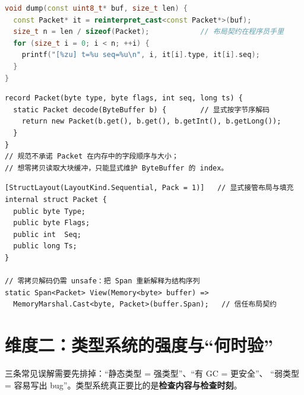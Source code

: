 \documentclass[12pt,a4paper,fontset=fandol]{ctexbook}
\begin{document}
\begin{lstlisting}[language=C++,caption={同一条协议线：把字节流``看成''结构（C 的传统优势）}]
void dump(const uint8_t* buf, size_t len) {
  const Packet* it = reinterpret_cast<const Packet*>(buf);
  size_t n = len / sizeof(Packet);            // 布局契约在程序员手里
  for (size_t i = 0; i < n; ++i) {
    printf("[%zu] t=%u seq=%u\n", i, it[i].type, it[i].seq);
  }
}
\end{lstlisting}

\begin{lstlisting}[style=javastyle,caption={Java 的等价物：没有布局假设，只有逐字段解码}]
record Packet(byte type, byte flags, int seq, long ts) {
  static Packet decode(ByteBuffer b) {        // 显式按字节序解码
    return new Packet(b.get(), b.get(), b.getInt(), b.getLong());
  }
}
// 规范不承诺 Packet 在内存中的字段顺序与大小；
// 想零拷贝读取大块缓冲，只能显式维护 ByteBuffer 的 index。
\end{lstlisting}

\begin{lstlisting}[style=csharpstyle,caption={C\#：默认布局交给运行时，想要 C 式布局必须显式``申请''}]
[StructLayout(LayoutKind.Sequential, Pack = 1)]   // 显式接管布局与填充
internal struct Packet {
  public byte Type;
  public byte Flags;
  public int  Seq;
  public long Ts;
}

// 零拷贝解码仍需 unsafe：把 Span 重新解释为结构序列
static Span<Packet> View(Memory<byte> buffer) =>
  MemoryMarshal.Cast<byte, Packet>(buffer.Span);   // 信任布局契约
\end{lstlisting}

\section{维度二：类型系统的强度与``何时验''}

三条常见误解需要先排掉：``静态类型 = 强类型''、``有 GC = 更安全''、
``弱类型 = 容易写出 bug''。类型系统真正要比的是\textbf{检查内容与检查时刻}。
\end{document}
